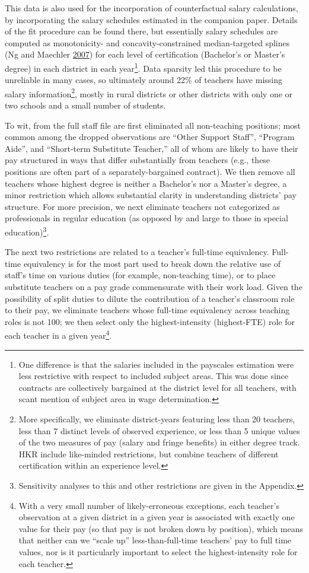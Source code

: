 \documentclass[12pt,]{article}
\let\rmarkdownfootnote\footnote%
\def\footnote{\protect\rmarkdownfootnote}
\begin{document}
This data is also used for the incorporation of counterfactual salary
calculations, by incorporating the salary schedules estimated in the
companion paper. Details of the fit procedure can be found there, but
essentially salary schedules are computed as monotonicity- and
concavity-constrained median-targeted splines (Ng and Maechler
\protect\hyperlink{ref-ng}{2007}) for each level of certification
(Bachelor's or Master's degree) in each district in each year\footnote{One
  difference is that the salaries included in the payscales estimation
  were less restrictive with respect to included subject areas. This was
  done since contracts are collectively bargained at the district level
  for all teachers, with scant mention of subject area in wage
  determination.}. Data sparsity led this procedure to be unreliable in
many cases, so ultimately around 22\% of teachers have missing salary
information\footnote{More specifically, we eliminate district-years
  featuring less than 20 teachers, less than 7 distinct levels of
  observed experience, or less than 5 unique values of the two measures
  of pay (salary and fringe benefits) in either degree track. HKR
  include like-minded restrictions, but combine teachers of different
  certification within an experience level.}, mostly in rural districts
or other districts with only one or two schools and a small number of
students.

To wit, from the full staff file are first eliminated all non-teaching
positions; most common among the dropped observations are ``Other
Support Staff'', ``Program Aide'', and ``Short-term Substitute
Teacher,'' all of whom are likely to have their pay structured in ways
that differ substantially from teachers (e.g., these positions are often
part of a separately-bargained contract). We then remove all teachers
whose highest degree is neither a Bachelor's nor a Master's degree, a
minor restriction which allows substantial clarity in understanding
districts' pay structure. For more precision, we next eliminate teachers
not categorized as professionals in regular education (as opposed by and
large to those in special education)\footnote{Sensitivity analyses to
  this and other restrictions are given in the Appendix.}.

The next two restrictions are related to a teacher's full-time
equivalency. Full-time equivalency is for the most part used to break
down the relative use of staff's time on various duties (for example,
non-teaching time), or to place substitute teachers on a pay grade
commensurate with their work load. Given the possibility of split duties
to dilute the contribution of a teacher's classroom role to their pay,
we eliminate teachers whose full-time equivalency across teaching roles
is not 100; we then select only the highest-intensity (highest-FTE) role
for each teacher in a given year\footnote{With a very small number of
  likely-erroneous exceptions, each teacher's observation at a given
  district in a given year is associated with exactly one value for
  their pay (so that pay is not broken down by position), which means
  that neither can we ``scale up'' less-than-full-time teachers' pay to
  full time values, nor is it particularly important to select the
  highest-intensity role for each teacher.}.
\end{document}
